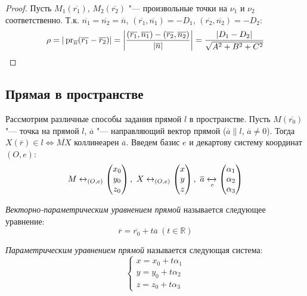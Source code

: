 \begin{proof}
	Пусть $M_1(\overline{r_1})$, $M_2(\overline{r_2})$ "--- произвольные точки на $\nu_1$ и $\nu_2$ соответственно. Т.\:к. $\overline{n_1} = \overline{n_2} = \overline{n}$, $(\overline{r_1}, \overline{n_1}) = -D_1$, $(\overline{r_2}, \overline{n_2}) = -D_2$:
	\[\rho = |\operatorname{pr}_{\overline{n}}(\overline{r_1} - \overline{r_2})| = \left|\frac{(\overline{r_1}, \overline{n_1}) - (\overline{r_2}, \overline{n_2})}{|\overline{n}|}\right| = \frac{|D_1 - D_2|}{\sqrt{A^2 + B^2 + C^2}}\]
\end{proof}

\subsection{Прямая в пространстве}

Рассмотрим различные способы задания прямой $l$ в пространстве. Пусть $M (\overline{r_0})$ "--- точка на прямой $l$, $\overline{a}$ "--- направляющий вектор прямой ($\overline{a} \parallel l$, $\overline{a} \ne 0$). Тогда $X (\overline{r}) \in l \Leftrightarrow \overline{MX} \text{ коллинеарен } \overline{a}$. Введем базис $e$ и декартову систему координат $(O, e)$:
\[M \leftrightarrow_{(O, e)}
\begin{pmatrix}
x_0\\y_0\\z_0
\end{pmatrix},~
X \leftrightarrow_{(O, e)}
\begin{pmatrix}
x\\y\\z
\end{pmatrix},~
\overline{a} \xleftrightarrow[e]{}
\begin{pmatrix}
\alpha_1\\\alpha_2\\\alpha_3
\end{pmatrix}\]

\begin{definition} \textit{Векторно-параметрическим уравнением прямой} называется следующее уравнение:
	\[\overline{r} = \overline{r_0} + t\overline{a}~(t \in \mathbb{R})\]
\end{definition}

\begin{definition} \textit{Параметрическим уравнением прямой} называется следующая система:
	\[\left\{
	\begin{aligned}
	x = x_0 + t\alpha_1\\
	y = y_0 + t\alpha_2\\
	z = z_0 + t\alpha_3
	\end{aligned}
	\right.
	\]
\end{definition}

